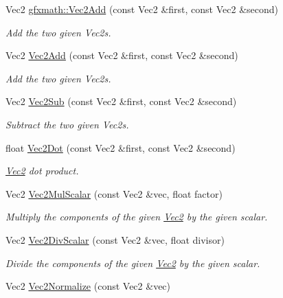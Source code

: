 \begin{DoxyCompactItemize}
\item 
Vec2 \hyperlink{group___s_i_s_d_vec_math_gac9d2c898c69c771b9d9993a4c4f1a146}{gfxmath\+::\+Vec2\+Add} (const Vec2 \&first, const Vec2 \&second)
\begin{DoxyCompactList}\small\item\em Add the two given Vec2s. \end{DoxyCompactList}\item 
Vec2 \hyperlink{group___s_i_s_d_vec_math_gac9d2c898c69c771b9d9993a4c4f1a146}{Vec2\+Add} (const Vec2 \&first, const Vec2 \&second)
\begin{DoxyCompactList}\small\item\em Add the two given Vec2s. \end{DoxyCompactList}\item 
Vec2 \hyperlink{group___s_i_s_d_vec_math_gabc910528ba2f4f4c3b69bf432e5c7731}{Vec2\+Sub} (const Vec2 \&first, const Vec2 \&second)
\begin{DoxyCompactList}\small\item\em Subtract the two given Vec2s. \end{DoxyCompactList}\item 
float \hyperlink{group___s_i_s_d_vec_math_gaf722c71a1e9ef7bf97d9489b1cf561e0}{Vec2\+Dot} (const Vec2 \&first, const Vec2 \&second)
\begin{DoxyCompactList}\small\item\em \hyperlink{classgfxmath_1_1_vec2}{Vec2} dot product. \end{DoxyCompactList}\item 
Vec2 \hyperlink{group___s_i_s_d_vec_math_ga8e4fd4586284706a28625b0fca6c85e7}{Vec2\+Mul\+Scalar} (const Vec2 \&vec, float factor)
\begin{DoxyCompactList}\small\item\em Multiply the components of the given \hyperlink{classgfxmath_1_1_vec2}{Vec2} by the given scalar. \end{DoxyCompactList}\item 
Vec2 \hyperlink{group___s_i_s_d_vec_math_ga8686be4c3f0ee27b05363661fb75a228}{Vec2\+Div\+Scalar} (const Vec2 \&vec, float divisor)
\begin{DoxyCompactList}\small\item\em Divide the components of the given \hyperlink{classgfxmath_1_1_vec2}{Vec2} by the given scalar. \end{DoxyCompactList}\item 
Vec2 \hyperlink{group___s_i_s_d_vec_math_gaa0125e18e221531bfc7d72d47cdf42d9}{Vec2\+Normalize} (const Vec2 \&vec)

\end{DoxyCompactItemize}
